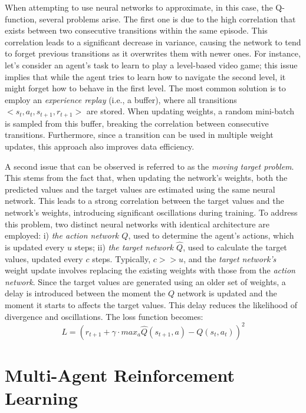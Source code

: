 \documentclass[12pt,a4paper,openright,twoside]{book}
\begin{document}
When attempting to use neural networks to approximate, in this case, the Q-function, several problems arise. 
    The first one is due to the high correlation that exists between two consecutive transitions within the same 
    episode. This correlation leads to a significant decrease in variance, causing the network to tend to forget 
    previous transitions as it overwrites them with newer ones. For instance, let's consider an agent's task to 
    learn to play a level-based video game; this issue implies that while the agent tries to learn how to navigate 
    the second level, it might forget how to behave in the first level. The most common solution is to employ an 
    \emph{experience replay} (i.e., a buffer), where all transitions $<s_t, a_t, s_{t+1}, r_{t+1}>$ are stored. 
    When updating weights, a random mini-batch is sampled from this buffer, breaking the correlation between consecutive
    transitions. Furthermore, since a transition can be used in multiple weight updates, this approach also 
    improves data efficiency.

A second issue that can be observed is referred to as the \emph{moving target problem}. This stems from the fact that,
    when updating the network's weights, both the predicted values and the target values are estimated using the 
    same neural network. This leads to a strong correlation between the target values and the network's weights, 
    introducing significant oscillations during training. To address this problem, two distinct neural networks 
    with identical architecture are employed: 
    i) \emph{the action network $Q$}, used to determine the agent's actions, which is updated every $u$ steps; 
    ii) \emph{the target network $\hat{Q}$}, used to calculate the target values, updated every $c$ steps. 
    Typically, $c >> u$, and the \emph{target network's} weight update involves replacing the existing weights with 
    those from the \emph{action network}.
    Since the target values are generated using an older set of weights, a delay is introduced between the 
    moment the $Q$ network is updated and the moment it starts to affects the target values.
    This delay reduces the likelihood of divergence and oscillations. The loss function becomes:
    $$ L = ( r_{t+1} + \gamma \cdot max_a \hat{Q}(s_{t+1}, a) - Q(s_t, a_t))^2 $$

\section{Multi-Agent Reinforcement Learning}
\end{document}
